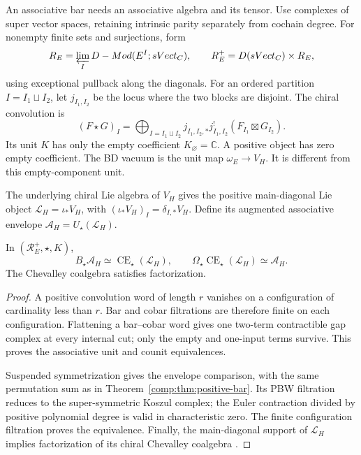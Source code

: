 An associative bar needs an associative algebra and its tensor.
Use complexes of super vector spaces, retaining intrinsic parity
separately from cochain degree. For nonempty finite sets and
surjections, form
\[
 \mathcal R_E=\varprojlim_I D\operatorname{-Mod}(E^I;\mathrm{sVect}_{\mathbb C}),
 \qquad \mathcal R_E^+=D(\mathrm{sVect}_{\mathbb C})\times\mathcal R_E,
\]
using exceptional pullback along the diagonals. For an ordered
partition \(I=I_1\sqcup I_2\), let \(j_{I_1,I_2}\) be the
locus where the two blocks are disjoint. The chiral convolution is
\[
 (F\star G)_I=\bigoplus_{I=I_1\sqcup I_2}
 j_{I_1,I_2,*}j_{I_1,I_2}^{!}(F_{I_1}\boxtimes G_{I_2}).
\]
Its unit \(K\) has only the empty coefficient \(K_\varnothing
=\mathbb C\). A positive object has zero empty coefficient.
The BD vacuum is the unit map $\omega_E\to V_H$. It is
different from this empty-component unit.

The underlying chiral Lie algebra of \(V_H\) gives the positive
main-diagonal Lie object \(\mathcal L_H=\iota_*V_H\), with
\((\iota_*V_H)_I=\delta_{I,*}V_H\). Define its augmented
associative envelope \(\mathcal A_H=U_\star(\mathcal L_H)\).

\begin{proposition}
\label{comp:prop:ran-envelope}
In \((\mathcal R_E^+,\star,K)\),
\[
 B_\star\mathcal A_H\simeq
 \operatorname{CE}_\star(\mathcal L_H),\qquad
 \Omega_\star\operatorname{CE}_\star(\mathcal L_H)
       \simeq\mathcal A_H.
\]
The Chevalley coalgebra satisfies factorization.
\end{proposition}
\begin{proof}
A positive convolution word of length \(r\) vanishes on a
configuration of cardinality less than \(r\). Bar and cobar
filtrations are therefore finite on each configuration. Flattening
a bar--cobar word gives one two-term contractible gap complex at
every internal cut; only the empty and one-input terms survive.
This proves the associative unit and counit equivalences.

Suspended symmetrization gives the envelope comparison, with the
same permutation sum as in Theorem~\ref{comp:thm:positive-bar}.
Its PBW filtration reduces to the super-symmetric Koszul complex;
the Euler contraction divided by positive polynomial degree is
valid in characteristic zero. The finite configuration filtration
proves the equivalence. Finally, the main-diagonal support of
\(\mathcal L_H\) implies factorization of its chiral Chevalley
coalgebra \cite[Theorems~5.1.1--5.2.1]{FG12}.
\end{proof}

